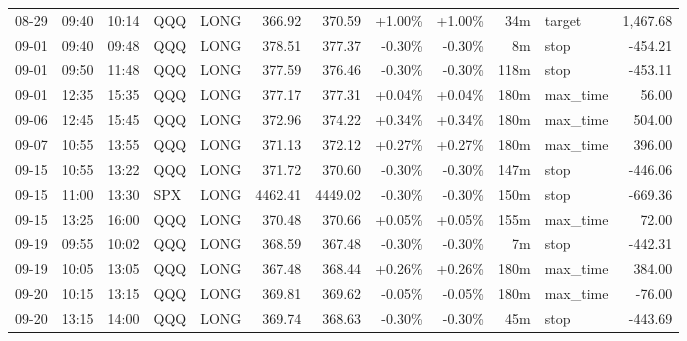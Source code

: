 \documentclass[11pt,a4paper,twoside]{article}
\begin{document}
\begin{center}
\begin{longtable}{>{\color{txtmain}}l l l l l r r r r r >{\color{txtmain}}l r}
08-29 & 09:40 & 10:14 & QQQ & LONG & 366.92 & 370.59 & \textcolor{wingreen}{+1.00\%} & \textcolor{wingreen}{+1.00\%} & 34m & target & \textcolor{wingreen}{1,467.68} \\
09-01 & 09:40 & 09:48 & QQQ & LONG & 378.51 & 377.37 & \textcolor{lossred}{-0.30\%} & \textcolor{lossred}{-0.30\%} & 8m & stop & \textcolor{lossred}{-454.21} \\
09-01 & 09:50 & 11:48 & QQQ & LONG & 377.59 & 376.46 & \textcolor{lossred}{-0.30\%} & \textcolor{lossred}{-0.30\%} & 118m & stop & \textcolor{lossred}{-453.11} \\
09-01 & 12:35 & 15:35 & QQQ & LONG & 377.17 & 377.31 & \textcolor{wingreen}{+0.04\%} & \textcolor{wingreen}{+0.04\%} & 180m & max\_time & \textcolor{wingreen}{56.00} \\
09-06 & 12:45 & 15:45 & QQQ & LONG & 372.96 & 374.22 & \textcolor{wingreen}{+0.34\%} & \textcolor{wingreen}{+0.34\%} & 180m & max\_time & \textcolor{wingreen}{504.00} \\
09-07 & 10:55 & 13:55 & QQQ & LONG & 371.13 & 372.12 & \textcolor{wingreen}{+0.27\%} & \textcolor{wingreen}{+0.27\%} & 180m & max\_time & \textcolor{wingreen}{396.00} \\
09-15 & 10:55 & 13:22 & QQQ & LONG & 371.72 & 370.60 & \textcolor{lossred}{-0.30\%} & \textcolor{lossred}{-0.30\%} & 147m & stop & \textcolor{lossred}{-446.06} \\
09-15 & 11:00 & 13:30 & SPX & LONG & 4462.41 & 4449.02 & \textcolor{lossred}{-0.30\%} & \textcolor{lossred}{-0.30\%} & 150m & stop & \textcolor{lossred}{-669.36} \\
09-15 & 13:25 & 16:00 & QQQ & LONG & 370.48 & 370.66 & \textcolor{wingreen}{+0.05\%} & \textcolor{wingreen}{+0.05\%} & 155m & max\_time & \textcolor{wingreen}{72.00} \\
09-19 & 09:55 & 10:02 & QQQ & LONG & 368.59 & 367.48 & \textcolor{lossred}{-0.30\%} & \textcolor{lossred}{-0.30\%} & 7m & stop & \textcolor{lossred}{-442.31} \\
09-19 & 10:05 & 13:05 & QQQ & LONG & 367.48 & 368.44 & \textcolor{wingreen}{+0.26\%} & \textcolor{wingreen}{+0.26\%} & 180m & max\_time & \textcolor{wingreen}{384.00} \\
09-20 & 10:15 & 13:15 & QQQ & LONG & 369.81 & 369.62 & \textcolor{lossred}{-0.05\%} & \textcolor{lossred}{-0.05\%} & 180m & max\_time & \textcolor{lossred}{-76.00} \\
09-20 & 13:15 & 14:00 & QQQ & LONG & 369.74 & 368.63 & \textcolor{lossred}{-0.30\%} & \textcolor{lossred}{-0.30\%} & 45m & stop & \textcolor{lossred}{-443.69} \\

\end{longtable}
\end{center}
\end{document}
